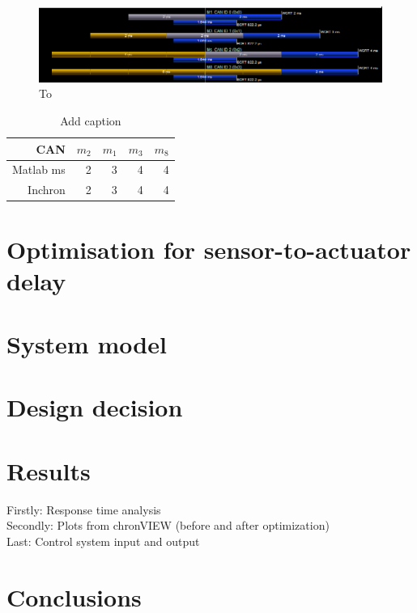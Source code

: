 \begin{figure}[h!]
	\begin{center}
		\includegraphics[width=\linewidth]{img/messagesCANtimings}
		\caption{To }
		\label{fig:msgCANtiming}
	\end{center}
\end{figure}

\begin{table}[htbp!]
	\centering
	\caption{Add caption}
	\begin{tabular}{rrrrr}
		\toprule
		CAN     & $m_2$   & $m_1$   & $m_3$   & $m_8$ \\
		\midrule
		Matlab ms & 2       & 3       & 4       & 4 \\
		Inchron & 2       & 3       & 4       & 4 \\
		\bottomrule
	\end{tabular}%
	\label{tab:addlabel}%
\end{table}%



\section{Optimisation for sensor-to-actuator delay}

\section{System model}

\section{Design decision}



\section{Results}

Firstly: Response time analysis\\
Secondly: Plots from chronVIEW (before and after optimization)\\
Last: Control system input and output

\section{Conclusions}